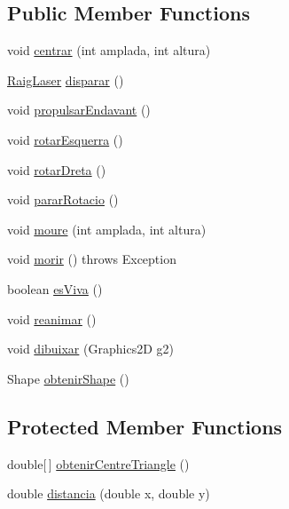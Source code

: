 \subsection*{Public Member Functions}
\begin{DoxyCompactItemize}
\item 
void \hyperlink{class_nau_a973eef3d7c7996553002b538481eadd6}{centrar} (int amplada, int altura)
\item 
\hyperlink{class_raig_laser}{Raig\+Laser} \hyperlink{class_nau_a7449b7bf128a70e305bc85781ee833f2}{disparar} ()
\item 
void \hyperlink{class_nau_af1f11339142c177a9a48990349fdf801}{propulsar\+Endavant} ()
\item 
void \hyperlink{class_nau_ae4f82160603f5b5c2108c34adcd781ab}{rotar\+Esquerra} ()
\item 
void \hyperlink{class_nau_a2ef947c89a39ad2e5593c9b63aefda46}{rotar\+Dreta} ()
\item 
void \hyperlink{class_nau_a5f603c39df04907891d3e56467df0cf0}{parar\+Rotacio} ()
\item 
void \hyperlink{class_nau_a8dc46f91e02910b92bfad9b798f6552c}{moure} (int amplada, int altura)
\item 
void \hyperlink{class_nau_a988c429432b7913e54522c0ab456a7ff}{morir} ()  throws Exception 
\item 
boolean \hyperlink{class_nau_ab7c4afa8c53657cf189d3f013dcf5ab5}{es\+Viva} ()
\item 
void \hyperlink{class_nau_a2d241e1fecd51c6b70f59144d11c1792}{reanimar} ()
\item 
void \hyperlink{class_nau_ad3456201f663473f3af9f17889708783}{dibuixar} (Graphics2\+D g2)
\item 
Shape \hyperlink{class_nau_a7a14f0feca0033e562a42816a42b4241}{obtenir\+Shape} ()
\end{DoxyCompactItemize}
\subsection*{Protected Member Functions}
\begin{DoxyCompactItemize}
\item 
double\mbox{[}$\,$\mbox{]} \hyperlink{class_nau_af8082681fcfd3613ee23597b9c525a7f}{obtenir\+Centre\+Triangle} ()
\item 
double \hyperlink{class_nau_a53690b8a1f0ceb5e0b4573d1c81314c3}{distancia} (double x, double y)
\end{DoxyCompactItemize}
